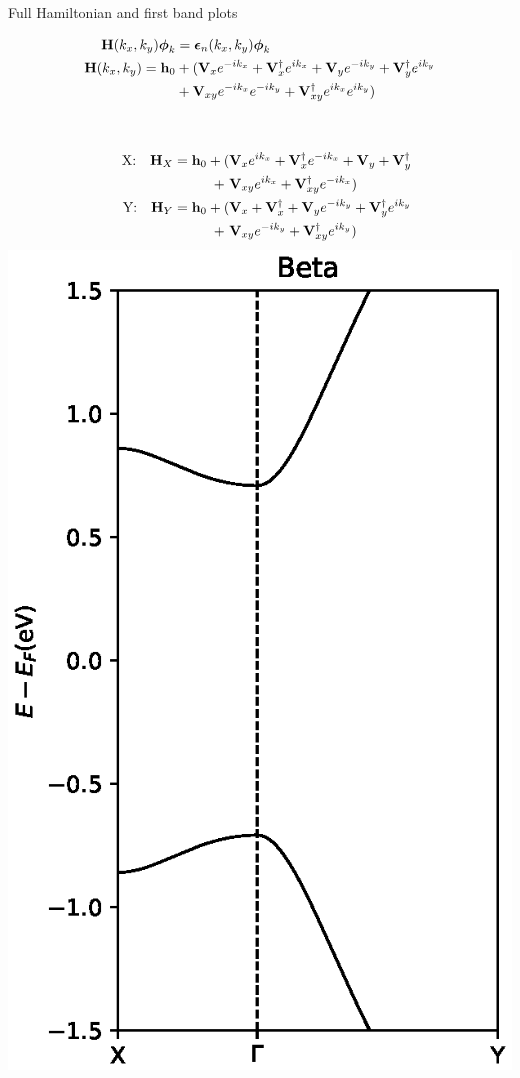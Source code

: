 \documentclass[hyperref={colorlinks=true,urlcolor=blue,linkcolor=.},aspectratio=1610,mathserif]{beamer}
\newcommand{\im}[3]{\inputminted[linenos=true, python3=true, firstline=#2, lastline=#3]{python}{#1}}
\begin{document}
\begin{frame}{Full Hamiltonian and first band plots}
\begin{overprint}
\begin{align}
    \vb{H}(k_x,k_y) \vb*{\phi}_k &= \vb*{\epsilon}_n\pqty{k_x,k_y}\vb*{\phi}_k\nonumber\\
	\vb{H}(k_x,k_y) = \vb{h}_0 &+ (\vb{V}_{x}e^{-ik_x} + \vb{V}_{x}^{\dagger}e^{ik_x} + \vb{V}_{y}e^{-ik_y} + \vb{V}_{y}^{\dagger}e^{ik_y}\nonumber\\
	&+ \vb{V}_{xy}e^{-ik_x}e^{-ik_y} + \vb{V}_{xy}^{\dagger}e^{ik_x}e^{ik_y})\nonumber
\end{align}
    \im{Listings/Functions.py}{73}{80}
    \begin{columns}[c]
\begin{align}
    \qq{X:} \vb{H}_{X} = \vb{h}_0 + (&\vb{V}_{x}e^{ik_x} + \vb{V}_{x}^{\dagger}e^{-ik_x} + \vb{V}_{y} + \vb{V}_{y}^{\dagger}\nonumber\\
    +\ &\vb{V}_{xy}e^{ik_x} + \vb{V}_{xy}^{\dagger}e^{-ik_x}) \nonumber\\
	\qq{Y:} \vb{H}_{Y} = \vb{h}_0 + (&\vb{V}_{x} + \vb{V}_{x}^{\dagger} + \vb{V}_{y}e^{-ik_y} + \vb{V}_{y}^{\dagger}e^{ik_y}\nonumber\\
	+\ &\vb{V}_{xy}e^{-ik_y} + \vb{V}_{xy}^{\dagger}e^{ik_y}) \nonumber
\end{align}
    \includegraphics[width=.65\textwidth]{Figures/BetaBandstructures.eps}
    \end{columns}
\end{overprint}
\end{frame}
\end{document}
